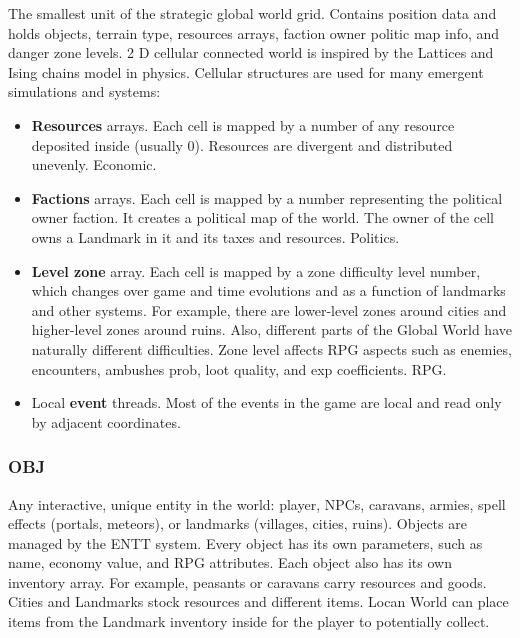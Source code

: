 \documentclass[a4paper,12pt]{article}
\begin{document}
The smallest unit of the strategic global world grid. Contains position data and holds objects, terrain type, resources arrays, faction owner politic map info, and danger zone levels. 2 D cellular connected world is inspired by the Lattices and Ising chains model in physics. Cellular structures are used for many emergent simulations and systems:

\begin{itemize}

\item \textbf{Resources} arrays. Each cell is mapped by a number of any resource deposited inside (usually 0). Resources are divergent and distributed unevenly. Economic.

\item \textbf{Factions} arrays. Each cell is mapped by a number representing the political owner faction. It creates a political map of the world. The owner of the cell owns a Landmark in it and its taxes and resources. Politics.

\item \textbf{Level zone} array. Each cell is mapped by a zone difficulty level number, which changes over game and time evolutions and as a function of landmarks and other systems. For example, there are lower-level zones around cities and higher-level zones around ruins. Also, different parts of the Global World have naturally different difficulties. Zone level affects RPG aspects such as enemies, encounters, ambushes prob, loot quality, and exp coefficients. RPG.

\item Local \textbf{event} threads. Most of the events in the game are local and read only by adjacent coordinates. 

\end{itemize}

\subsubsection{OBJ}  

Any interactive, unique entity in the world: player, NPCs, caravans, armies, spell effects (portals, meteors), or landmarks (villages, cities, ruins). Objects are managed by the ENTT system. Every object has its own parameters, such as name, economy value, and RPG attributes. Each object also has its own inventory array. For example, peasants or caravans carry resources and goods. Cities and Landmarks stock resources and different items. Locan World can place items from the Landmark inventory inside for the player to potentially collect.
\end{document}
